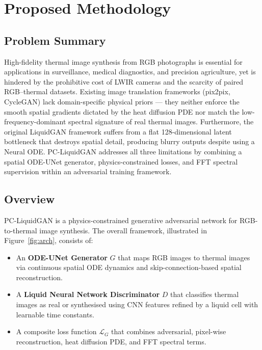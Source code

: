 \chapter{Proposed Methodology}
\label{Chapter3}

\section{Problem Summary}

High-fidelity thermal image synthesis from RGB photographs is essential for applications in surveillance, medical diagnostics, and precision agriculture, yet is hindered by the prohibitive cost of LWIR cameras and the scarcity of paired RGB--thermal datasets. Existing image translation frameworks (pix2pix, CycleGAN) lack domain-specific physical priors --- they neither enforce the smooth spatial gradients dictated by the heat diffusion PDE nor match the low-frequency-dominant spectral signature of real thermal images. Furthermore, the original LiquidGAN framework suffers from a flat 128-dimensional latent bottleneck that destroys spatial detail, producing blurry outputs despite using a Neural ODE. PC-LiquidGAN addresses all three limitations by combining a spatial ODE-UNet generator, physics-constrained losses, and FFT spectral supervision within an adversarial training framework.

\section{Overview}

PC-LiquidGAN is a physics-constrained generative adversarial network for RGB-to-thermal image synthesis. The overall framework, illustrated in Figure~\ref{fig:arch}, consists of:
\begin{itemize}
    \item An \textbf{ODE-UNet Generator} $G$ that maps RGB images to thermal images via continuous spatial ODE dynamics and skip-connection-based spatial reconstruction.
    \item A \textbf{Liquid Neural Network Discriminator} $D$ that classifies thermal images as real or synthesised using CNN features refined by a liquid cell with learnable time constants.
    \item A composite loss function $\mathcal{L}_G$ that combines adversarial, pixel-wise reconstruction, heat diffusion PDE, and FFT spectral terms.
\end{itemize}

